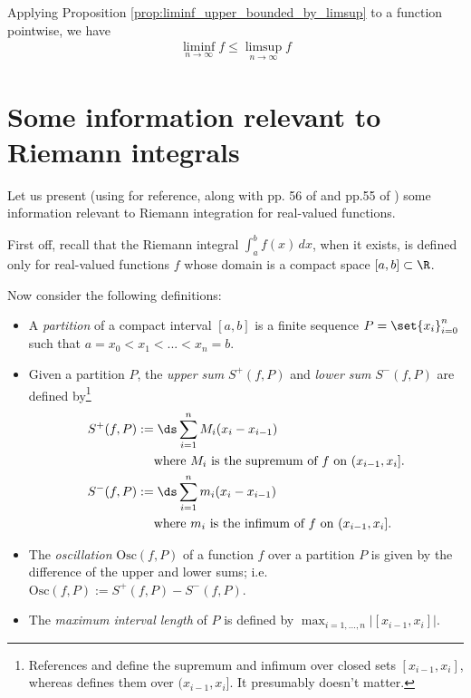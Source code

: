 \documentclass{article} %
\begin{document}
Applying Proposition \ref{prop:liminf_upper_bounded_by_limsup} to a function pointwise, we have 
\begin{align}
\liminf_{n \to \infty} f  \leq \limsup_{n \to \infty} f  
\label{eqn:liminf_upper_bounded_by_limsup_for_functions}
\end{align}



\section{Some information relevant to Riemann integrals} \label{sec:some_info_relevant_to_Riemann_integrals}

Let us present (using  \cite{strichartz2000way} for reference, along with pp. 56 of \cite{folland1999real} and pp.55 of \cite{ash2000probability}) some information relevant to Riemann integration for real-valued functions.  

First off, recall that the Riemann integral $\int_{a}^b f(x) \, dx$, when it exists,  is defined only for real-valued functions  $f$ whose domain is a compact space $[a,b] \subset \R$.   

Now consider the following definitions:

\begin{itemize}
\item A \textit{partition} of a compact interval $[a,b]$ is a finite sequence $P=\set{x_i}_{i=0}^n$ such that $a=x_0 < x_1 < ... < x_n = b$. 
\item Given a partition $P$, the \textit{upper sum} $S^+(f,P)$ and \textit{lower sum} $S^-(f,P)$ are defined by\footnote{References \cite{strichartz2000way} and \cite{folland1999real} define the supremum and infimum over closed sets $[x_{i-1}, x_i]$, whereas \cite{ash2000probability} defines them over $(x_{i-1},x_i]$.  It presumably doesn't matter.}
\begin{align*}
S^+(f,P) &:= \ds\sum_{i=1}^n M_i (x_i - x_{i-1}) \\
&\quad \text{ where $M_i$ is the supremum of $f$ on $(x_{i-1}, x_i]$.} \\	
S^-(f,P) &:= \ds\sum_{i=1}^n m_i (x_i - x_{i-1}) \\
&\quad \text{ where $m_i$ is the infimum of $f$ on $(x_{i-1}, x_i]$.} \\
\end{align*}
\item The \textit{oscillation} $\text{Osc}(f,P)$ of a function $f$ over a partition $P$ is given by the difference of the upper and lower sums; i.e. $ \text{Osc}(f,P) := S^+(f,P) - S^-(f,P)$.
\item The \textit{maximum interval length} of $P$ is defined by $ \max_{i=1,...,n} \big|[x_{i-1}, x_i]\big|$.
\end{itemize}
\end{document}
